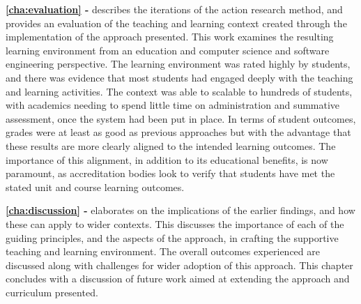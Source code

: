 \textbf{\cref{cha:evaluation} - } describes the iterations of the action research method, and provides an evaluation of the teaching and learning context created through the implementation of the approach presented. This work examines the resulting learning environment from an education and computer science and software engineering perspective. The learning environment was rated highly by students, and there was evidence that most students had engaged deeply with the teaching and learning activities. The context was able to scalable to hundreds of students, with academics needing to spend little time on administration and summative assessment, once the system had been put in place. In terms of student outcomes, grades were at least as good as previous approaches but with the advantage that these results are more clearly aligned to the intended learning outcomes. The importance of this alignment, in addition to its educational benefits, is now paramount, as accreditation bodies look to verify that students have met the stated unit and course learning outcomes. 



\textbf{\cref{cha:discussion} - } elaborates on the implications of the earlier findings, and how these can apply to wider contexts. This discusses the importance of each of the guiding principles, and the aspects of the approach, in crafting the supportive teaching and learning environment. The overall outcomes experienced are discussed along with challenges for wider adoption of this approach. This chapter concludes with a discussion of future work aimed at extending the approach and curriculum presented.

